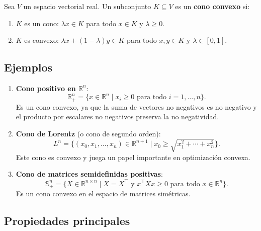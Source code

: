 \documentclass[12pt]{book}
\theoremstyle{definition}
\newtheorem{definicion}{Definición}[section]
\theoremstyle{plain}
\theoremstyle{remark}
\newtheorem{observacion}{Observación}[section]
\begin{document}
Sea \( V \) un espacio vectorial real. Un subconjunto \( K \subseteq V \) es un \textbf{cono convexo} si:
\begin{enumerate}
    \item \( K \) es un cono: \( \lambda x \in K \) para todo \( x \in K \) y \( \lambda \geq 0 \).
    \item \( K \) es convexo: \( \lambda x + (1 - \lambda) y \in K \) para todo \( x, y \in K \) y \( \lambda \in [0,1] \).
\end{enumerate}

\subsection{Ejemplos}

\begin{enumerate}
    \item \textbf{Cono positivo en \( \mathbb{R}^n \)}:
    \[
    \mathbb{R}^n_+ = \{ x \in \mathbb{R}^n \mid x_i \geq 0 \text{ para todo } i = 1, \ldots, n \}.
    \]
    Es un cono convexo, ya que la suma de vectores no negativos es no negativo y el producto por escalares no negativos preserva la no negatividad.

    \item \textbf{Cono de Lorentz} (o cono de segundo orden):
    \[
    L^n = \{ (x_0, x_1, \ldots, x_n) \in \mathbb{R}^{n+1} \mid x_0 \geq \sqrt{x_1^2 + \cdots + x_n^2} \}.
    \]
    Este cono es convexo y juega un papel importante en optimización convexa.

    \item \textbf{Cono de matrices semidefinidas positivas}:
    \[
    \mathbb{S}^n_+ = \{ X \in \mathbb{R}^{n \times n} \mid X = X^\top \text{ y } x^\top X x \geq 0 \text{ para todo } x \in \mathbb{R}^n \}.
    \]
    Es un cono convexo en el espacio de matrices simétricas.
\end{enumerate}

\subsection{Propiedades principales}
\end{document}
